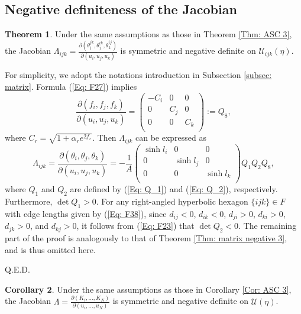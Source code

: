\documentclass[12pt]{amsart}
\theoremstyle{definition}
\newtheorem{theorem}{Theorem}[section]
\newtheorem{corollary}[theorem]{Corollary}
\def\qed{\hfill{Q.E.D.}\smallskip}
\begin{document}
\subsection{Negative definiteness of the Jacobian}

\begin{theorem}\label{Thm: matrix negative 4}
Under the same assumptions as those in Theorem \ref{Thm: ASC 3},
the Jacobian $\Lambda_{ijk}=\frac{\partial(\theta^{jk}_i,\theta^{ik}_j,\theta^{ij}_k)}
{\partial(u_i,u_j,u_k)}$ is symmetric and negative definite on $\mathcal{U}_{ijk}(\eta)$.
\end{theorem}
\proof
For simplicity, we adopt the notations introduction in Subsection \ref{subsec: matrix}.
Formula (\ref{Eq: F27}) implies
\begin{equation*}
\frac{\partial(f_i,f_j,f_k)}
{\partial(u_i,u_j,u_k)}
=\left(
   \begin{array}{ccc}
     -C_i & 0 & 0 \\
     0 & C_j & 0 \\
     0 & 0 & C_k \\
   \end{array}
 \right)
 :=Q_8,
\end{equation*}
where $C_r=\sqrt{1+\alpha_re^{2f_r}}$.
Then $\Lambda_{ijk}$ can be expressed as 
\begin{equation*}
\Lambda_{ijk}=
\frac{\partial(\theta_i,\theta_j,\theta_k)}
{\partial(u_i,u_j,u_k)}
=-\frac{1}{A}
 \left(
   \begin{array}{ccc}
     \sinh l_i & 0 & 0 \\
     0 & \sinh l_j & 0 \\
     0 & 0 & \sinh l_k \\
   \end{array}
 \right)Q_1Q_2Q_8,
\end{equation*}
where $Q_1$ and $Q_2$ are defined by (\ref{Eq: Q_1})  and (\ref{Eq: Q_2}), respectively.
Furthermore, $\det Q_1>0$.
For any right-angled hyperbolic hexagon $\{ijk\}\in F$ with edge lengths given by (\ref{Eq: F38}),
since $d_{ij}<0$, $d_{ik}<0$, $d_{ji}>0$, $d_{ki}>0$, $d_{jk}>0$, and $d_{kj}>0$,
it follows from (\ref{Eq: F23}) that $\det Q_2<0$.
The remaining part of the proof is analogously to that of Theorem \ref{Thm: matrix negative 3}, and is thus omitted here.

\qed

\begin{corollary}
Under the same assumptions as those in Corollary \ref{Cor: ASC 3},
the Jacobian $\Lambda=\frac{\partial (K_i,..., K_N)}{\partial(u_i,...,u_N)}$ is symmetric and negative definite on $\mathcal{U}(\eta)$.
\end{corollary}
\end{document}
